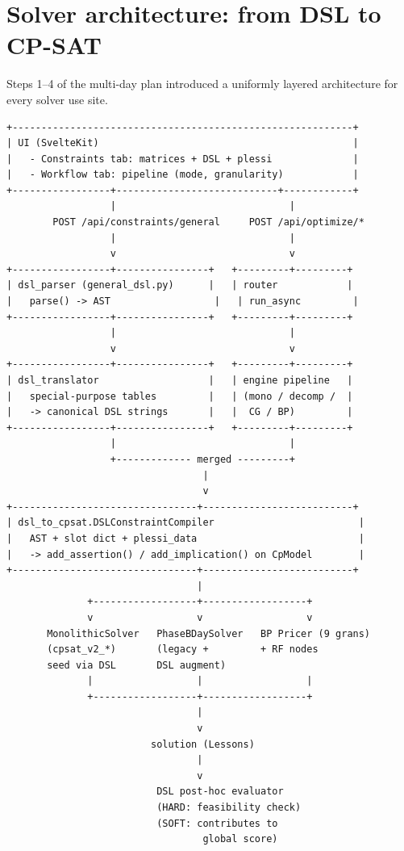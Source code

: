 \section{Solver architecture: from DSL to CP-SAT}
\label{sec:arch-dsl-cpsat-en}

Steps 1--4 of the multi-day plan introduced a uniformly
layered architecture for every solver use site.

\begin{verbatim}
+-----------------------------------------------------------+
| UI (SvelteKit)                                            |
|   - Constraints tab: matrices + DSL + plessi              |
|   - Workflow tab: pipeline (mode, granularity)            |
+-----------------+----------------------------+------------+
                  |                              |
        POST /api/constraints/general     POST /api/optimize/*
                  |                              |
                  v                              v
+-----------------+----------------+   +---------+---------+
| dsl_parser (general_dsl.py)      |   | router            |
|   parse() -> AST                  |   | run_async         |
+-----------------+----------------+   +---------+---------+
                  |                              |
                  v                              v
+-----------------+----------------+   +---------+---------+
| dsl_translator                   |   | engine pipeline   |
|   special-purpose tables         |   | (mono / decomp /  |
|   -> canonical DSL strings       |   |  CG / BP)         |
+-----------------+----------------+   +---------+---------+
                  |                              |
                  +------------- merged ---------+
                                  |
                                  v
+--------------------------------+--------------------------+
| dsl_to_cpsat.DSLConstraintCompiler                         |
|   AST + slot dict + plessi_data                            |
|   -> add_assertion() / add_implication() on CpModel        |
+--------------------------------+--------------------------+
                                 |
              +------------------+------------------+
              v                  v                  v
       MonolithicSolver   PhaseBDaySolver   BP Pricer (9 grans)
       (cpsat_v2_*)       (legacy +         + RF nodes
       seed via DSL       DSL augment)
              |                  |                  |
              +------------------+------------------+
                                 |
                                 v
                         solution (Lessons)
                                 |
                                 v
                          DSL post-hoc evaluator
                          (HARD: feasibility check)
                          (SOFT: contributes to
                                  global score)
\end{verbatim}

